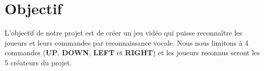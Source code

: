 \section{Objectif}
\label{sec:objectif}

L'objectif de notre projet est de créer un jeu vidéo qui puisse reconnaître les
joueurs et leurs commandes par reconnaissance vocale. Nous nous limitons à 4
commandes (\textbf{UP}, \textbf{DOWN}, \textbf{LEFT} et \textbf{RIGHT}) et les
joueurs reconnus seront les 5 créateurs du projet.